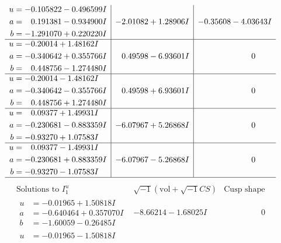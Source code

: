 \documentclass[1p]{elsarticle_modified}
\theoremstyle{definition}
\newcommand{\I}{\sqrt{-1}}
\begin{document}
$$\begin{array}{c|c|c}
\begin{aligned}
u &= -0.105822 - 0.496599 I \\
a &= \phantom{-}0.191381 - 0.934900 I \\
b &= -1.291070 + 0.220220 I\end{aligned}
 & -2.01082 + 1.28906 I & -0.35608 - 4.03643 I \\ \hline\begin{aligned}
u &= -0.20014 + 1.48162 I \\
a &= -0.340642 + 0.355766 I \\
b &= \phantom{-}0.448756 - 1.274480 I\end{aligned}
 & \phantom{-}0.49598 - 6.93601 I & \phantom{-0.000000 } 0 \\ \hline\begin{aligned}
u &= -0.20014 - 1.48162 I \\
a &= -0.340642 - 0.355766 I \\
b &= \phantom{-}0.448756 + 1.274480 I\end{aligned}
 & \phantom{-}0.49598 + 6.93601 I & \phantom{-0.000000 } 0 \\ \hline\begin{aligned}
u &= \phantom{-}0.09377 + 1.49931 I \\
a &= -0.230681 - 0.883359 I \\
b &= -0.93270 + 1.07583 I\end{aligned}
 & -6.07967 + 5.26868 I & \phantom{-0.000000 } 0 \\ \hline\begin{aligned}
u &= \phantom{-}0.09377 - 1.49931 I \\
a &= -0.230681 + 0.883359 I \\
b &= -0.93270 - 1.07583 I\end{aligned}
 & -6.07967 - 5.26868 I & \phantom{-0.000000 } 0\\
 \hline 
 \end{array}$$\newpage$$\begin{array}{c|c|c}  
\text{Solutions to }I^u_{1}& \I (\text{vol} + \sqrt{-1}CS) & \text{Cusp shape}\\
 \hline 
\begin{aligned}
u &= -0.01965 + 1.50818 I \\
a &= -0.640464 + 0.357070 I \\
b &= -1.60059 - 0.26485 I\end{aligned}
 & -8.66214 - 1.68025 I & \phantom{-0.000000 } 0 \\ \hline\begin{aligned}
u &= -0.01965 - 1.50818 I \\

\end{aligned}
\end{array}$$
\end{document}
